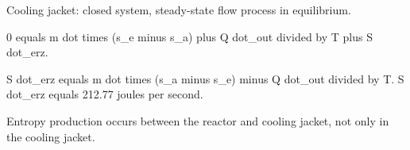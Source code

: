 Cooling jacket: closed system, steady-state flow process in equilibrium.  

0 equals m dot times (s_e minus s_a) plus Q dot_out divided by T plus S dot_erz.  

S dot_erz equals m dot times (s_a minus s_e) minus Q dot_out divided by T.  
S dot_erz equals 212.77 joules per second.  

Entropy production occurs between the reactor and cooling jacket, not only in the cooling jacket.